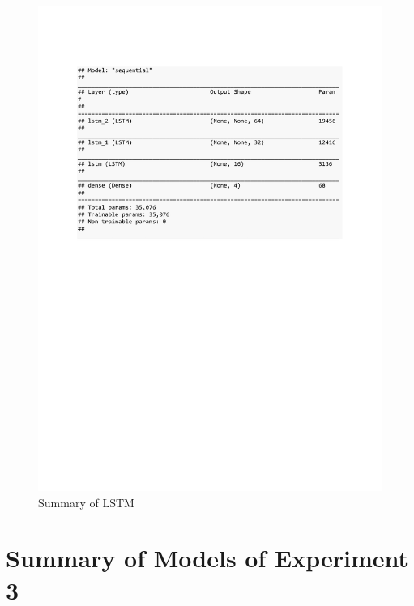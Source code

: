 \begin{figure}[h]
	\centering
	\includegraphics[scale=0.5]{Figures/summary_LSTM_pred_house_temp}
	\decoRule
	\caption[Experiment 2: Summary of LSTM for unsupervised learning]{Summary of LSTM \parencite{own}}
	\label{fig:summary_LSTM_pred_house_temp}
\end{figure}

\clearpage
\section{Summary of Models of Experiment 3}

